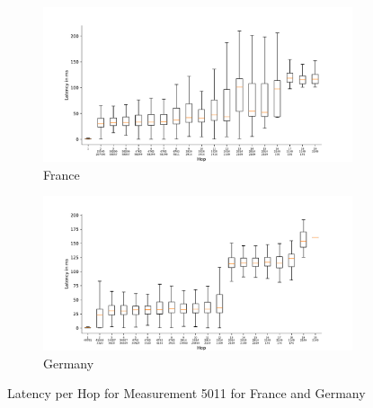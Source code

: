 \begin{figure}
	\centering
	\begin{subfigure}[b]{\linewidth}
		\includegraphics[width=\linewidth]{chapters/4-results/traceroute/img/latency-per-hop-FR-5011.pdf}
		\caption{France}
	\end{subfigure}
	\begin{subfigure}[b]{\linewidth}
		\includegraphics[width=\linewidth]{chapters/4-results/traceroute/img/latency-per-hop-DE-5011.pdf}
		\caption{Germany}
	\end{subfigure}
	\caption{Latency per Hop for Measurement 5011 for France and Germany}
	\label{fig:latency-change-per-hop-appendix-10}
\end{figure}


